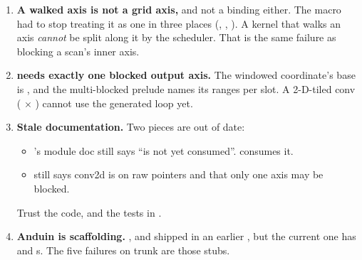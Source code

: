 \begin{enumerate}[leftmargin=1.4em,itemsep=0.45em]
  element count right and the shape wrong once a block exceeds the innermost extent.
  A graph walk must clamp and re-box (\S\ref{sec:edges}).
\item \textbf{A walked axis is not a grid axis,} and not a binding either. The macro
  had to stop treating it as one in three places (,
  , ). A kernel that walks an axis
  \emph{cannot} be split along it by the scheduler. That is the same failure as
  blocking a scan's inner axis.
\item \textbf{ needs exactly one blocked output axis.} The
  windowed coordinate's base is , and the multi-blocked prelude
  names its ranges per slot. A 2-D-tiled conv ( $\times$
  ) cannot use the generated loop yet.
\item \textbf{Stale documentation.} Two pieces are out of date:
  \begin{itemize}
  \item {}'s module doc still says  ``is not yet
    consumed''.  consumes it.
  \item {} still says conv2d is on raw pointers
    and that only one axis may be blocked.
  \end{itemize}
  Trust the code, and the tests in .
\item \textbf{Anduin is scaffolding.} ,  and
   shipped in an earlier , but the current one has 
  and s. The five  failures on trunk are those
  stubs.
\end{enumerate}

